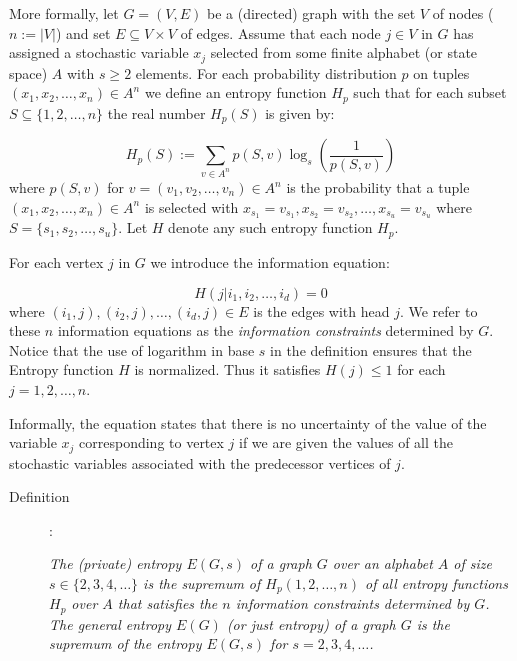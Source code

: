 \documentclass[12pt]{article}
\begin{document}
More formally, let $G=(V,E)$ be a (directed) graph with the set $V$ of nodes ($n:=|V|$) and set $E \subseteq V \times V$ of edges. Assume that each node $j\in V$ in $G$ has assigned a stochastic variable $x_j$ selected from some finite alphabet (or state space) $A$ with $s \geq 2$ elements. 
For each probability distribution $p$ on tuples $(x_1,x_2,\ldots,x_n) \in A^n$ we define an entropy function $H_{p}$ such that for each subset $S \subseteq \{1,2,\ldots, n\}$  the real number $H_{p}(S)$ is given by:

\begin{equation}
H_{p}(S):=\sum_{v \in A^n} p(S,v) \log_{s}(\frac{1}{p(S,v)})
\end{equation}
where $p(S,v)$ for $v=(v_1,v_2, \ldots,v_n) \in A^n$ is the probability that a tuple $(x_1,x_2,\ldots,x_n)  \in A^n$  is selected with 
$x_{s_1}=v_{s_1}, x_{s_2}=v_{s_2}, \ldots, x_{s_u}=v_{s_u}$ where $S=\{s_1,s_2,\ldots,s_u\}$.
Let $H$ denote any such entropy function $H_p$. 

For each vertex $j$ in $G$ we introduce the information equation: 

\begin{equation}
H(j | i_1,i_2,\ldots, i_d)=0 
\end{equation}
where $(i_1,j),(i_2,j),\ldots, (i_d,j) \in E$ is the edges with head 
$j$.  We refer to these $n$ information equations as the {\it information constraints} determined by $G$.
Notice that the use of logarithm in base $s$ in the definition ensures that the Entropy function $H$ is normalized. Thus it satisfies $H(j) \leq 1$ for each $j=1,2,\ldots,n$. 

Informally, the equation states that there is no uncertainty of the value of the variable $x_j$ corresponding to vertex $j$ if we are given the values of all the stochastic variables associated with  the
predecessor vertices of $j$. 

\begin{description}

\item[Definition]:

\noindent
{\it The (private) entropy $E(G,s)$ of a graph $G$ over an alphabet $A$ of size $s \in \{2,3,4, \ldots\}$ is the supremum of $H_p(1,2, \ldots, n)$ of all entropy functions $H_p$ over $A$  that satisfies the $n$ information constraints determined by $G$. 
The general entropy $E(G)$ (or just entropy) of a graph $G$ is the supremum of the entropy $E(G,s)$
for $s=2,3,4,\ldots$.}
\end{description}
\end{document}
